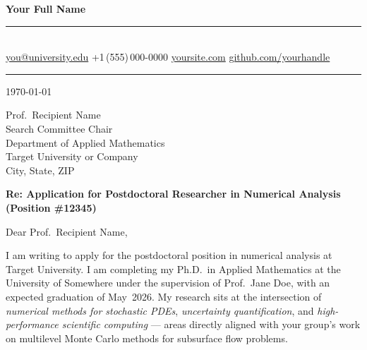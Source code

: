 \documentclass[10pt,letterpaper]{article}
\begin{document}
\begin{center}
  {\fontsize{18}{22}\selectfont\bfseries\color{NavyDeep} Your Full Name}\\[3pt]%
  {\color{AccentTeal}\rule{3cm}{1pt}}\\[4pt]%
  {\small\color{SubtleGray}%
    \Email\enspace\href{mailto:you@university.edu}{you@university.edu}%
    \quad\textbar\quad%
    \Telefon\enspace +1\,(555)\,000-0000%
    \quad\textbar\quad%
    \href{https://yoursite.com}{yoursite.com}%
    \quad\textbar\quad%
    \href{https://github.com/yourhandle}{github.com/yourhandle}%
  }%
\end{center}
{\color{RuleGray}\rule{\linewidth}{0.4pt}}

\bigskip

{\color{SubtleGray}\today}

\medskip

Prof.\ Recipient Name\\         %
Search Committee Chair\\
Department of Applied Mathematics\\
Target University or Company\\  %
City, State, ZIP                %

\medskip

\textbf{Re: Application for Postdoctoral Researcher in Numerical Analysis
(Position \#12345)}             %

\medskip

Dear Prof.\ Recipient Name,     %

I am writing to apply for the postdoctoral position in numerical analysis
at Target University.           %
I am completing my Ph.D.\ in Applied Mathematics at the University of
Somewhere under the supervision of Prof.\ Jane Doe, with an expected
graduation of May~2026.
My research sits at the intersection of \textit{numerical methods for
stochastic PDEs}, \textit{uncertainty quantification}, and
\textit{high-performance scientific computing} — areas directly aligned
with your group's work on multilevel Monte Carlo methods for subsurface
flow problems.                  %
\end{document}
